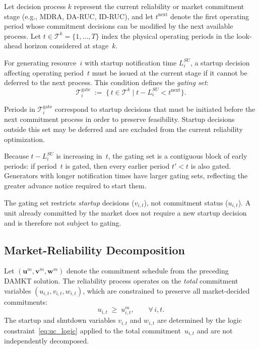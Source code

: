 \documentclass[journal]{IEEEtran}
\begin{document}
Let decision process $k$ represent the current reliability or market
commitment stage (e.g., MDRA, DA-RUC, ID-RUC), and let
$t^{\text{next}}$ denote the first operating period whose commitment
decisions can be modified by the next available process.
Let $t \in \mathcal{T}^k = \{1,\dots,T\}$ index the physical
operating periods in the look-ahead horizon considered at stage~$k$.

For generating resource~$i$ with startup notification time
$L_i^{SU}$, a startup decision affecting operating period~$t$ must
be issued at the current stage if it cannot be deferred to the next
process.
This condition defines the \emph{gating set}:
\begin{equation}\label{eq:gating_set}
    \mathcal{T}_{i}^{\text{gate}} \;:=\;
    \bigl\{\, t \in \mathcal{T}^k \;\big|\;
            t - L_i^{SU} < t^{\text{next}} \bigr\}.
\end{equation}

Periods in $\mathcal{T}_{i}^{\text{gate}}$ correspond to startup
decisions that must be initiated before the next commitment process
in order to preserve feasibility.
Startup decisions outside this set may be deferred and are excluded
from the current reliability optimization.

Because $t - L_i^{SU}$ is increasing in~$t$, the gating set is a
contiguous block of early periods: if period~$t$ is gated, then every
earlier period $t' < t$ is also gated.
Generators with longer notification times have larger gating sets,
reflecting the greater advance notice required to start them.

The gating set restricts \emph{startup} decisions ($v_{i,t}$), not
commitment status ($u_{i,t}$).
A unit already committed by the market does not require a new startup
decision and is therefore not subject to gating.

\subsection{Market-Reliability Decomposition}\label{sec:decomp}

Let $(\mathbf{u}^m, \mathbf{v}^m, \mathbf{w}^m)$ denote the
commitment schedule from the preceding DAMKT solution.
The reliability process operates on the \emph{total} commitment
variables $(u_{i,t}, v_{i,t}, w_{i,t})$, which are constrained to
preserve all market-decided commitments:
\begin{equation}\label{eq:nodecommit}
    u_{i,t} \;\geq\; u_{i,t}^m, \qquad \forall\, i,t.
\end{equation}
The startup and shutdown variables $v_{i,t}$ and $w_{i,t}$ are
determined by the logic constraint~\eqref{eq:uc_logic} applied to the
total commitment~$u_{i,t}$ and are not independently decomposed.
\end{document}
